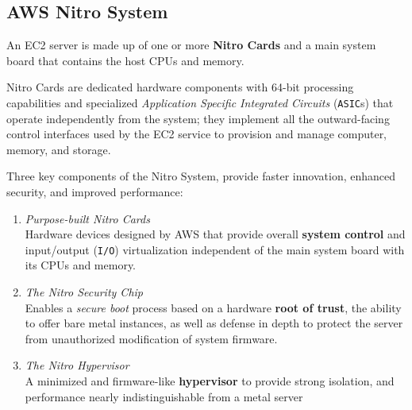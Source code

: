 \subsection{AWS Nitro System}
An EC2 server is made up of one or more \textbf{Nitro Cards} and a main system
board that contains the host CPUs and memory.

Nitro Cards are dedicated hardware components with 64-bit processing
capabilities and specialized \textit{Application Specific Integrated Circuits}
(\texttt{ASIC}s) that operate independently from the system; 
they implement all the outward-facing control interfaces used by the EC2 service to provision and manage computer, memory, and storage.

Three key components of the Nitro System, provide faster innovation, enhanced
security, and improved performance:
\begin{enumerate}
   \item \textit{Purpose-built Nitro Cards}\\
   Hardware devices designed by AWS that
   provide overall \textbf{system control} and input/output (\texttt{I/O}) virtualization
   independent of the main system board with its CPUs and memory.
   \item \textit{The Nitro Security Chip}\\
   Enables a \textit{secure boot} process based on a
   hardware \textbf{root of trust}, the ability to offer bare metal instances, as well as
   defense in depth to protect the server from unauthorized modification of
   system firmware.
   \item \textit{The Nitro Hypervisor}\\
   A minimized and firmware-like \textbf{hypervisor} to
   provide strong isolation, and performance nearly indistinguishable from a metal server
\end{enumerate}
